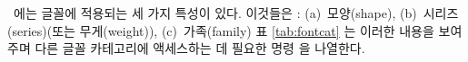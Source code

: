 
\ltx\ 에는 글꼴에 적용되는 세 가지 특성이 있다. 이것들은 : 
(a)~모양(shape), 
(b)~시리즈(series)(또는 무게(weight)),  %
(c)~가족(family)
 표 \ref{tab:fontcat} 는 이러한 내용을 보여 주며 다른 글꼴 카테고리에 액세스하는 데 필요한 명령 을 나열한다.

